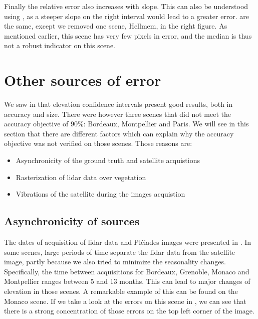 Finally the relative error also increases with slope. This can also be understood using , as a steeper slope on the right interval would lead to a greater error.  are the same, except we removed one scene, Hellmem, in the right figure. As mentioned earlier, this scene has very few pixels in error, and the median is thus not a robust indicator on this scene.

\section{Other sources of error}\label{sec:other_errors}
We saw in  that elevation confidence intervals present good results, both in accuracy and size. There were however three scenes that did not meet the accuracy objective of $90\%$: Bordeaux, Montpellier and Paris. We will see in this section that there are different factors which can explain why the accuracy objective was not verified on those scenes. Those reasons are: 
\begin{itemize}
    \item Asynchronicity of the ground truth and satellite acquistions
    \item Rasterization of \acrshort{lidar} data over vegetation
    \item Vibrations of the satellite during the images acquistion
\end{itemize}

\subsection{Asynchronicity of sources}
The dates of acquisition of \acrshort{lidar} data and Pléiades images were presented in . In some scenes, large periods of time separate the \acrshort{lidar} data from the satellite image, partly because we also tried to minimize the seasonality changes. Specifically, the time between acquisitions for Bordeaux, Grenoble, Monaco and Montpellier ranges between 5 and 13 months. This can lead to major changes of elevation in those scenes. A remarkable example of this can be found on the Monaco scene. If we take a look at the errors on this scene in , we can see that there is a strong concentration of those errors on the top left corner of the image. 

